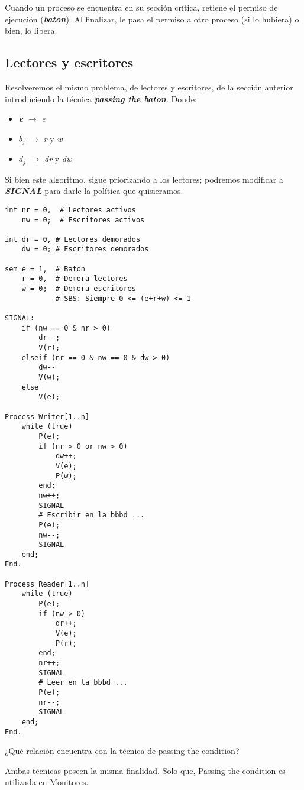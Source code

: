 \documentclass[a4paper, 10pt]{report}
\begin{document}
Cuando un proceso se encuentra en su sección crítica, retiene el permiso de ejecución (\textbf{\emph{baton}}). Al finalizar, le pasa el permiso a otro proceso (si lo hubiera) o bien, lo libera.

\subsection{Lectores y escritores}

Resolveremos el mismo problema, de lectores y escritores, de la sección anterior introduciendo la técnica \textbf{\emph{passing the baton}}. Donde:

\begin{itemize}
    \item \textbf{\emph{e}} $\rightarrow$ \emph{e}
    \item \textbf{\emph{$b_j$}} $\rightarrow$ \emph{r} y \emph{w}
    \item \textbf{\emph{$d_j$}} $\rightarrow$ \emph{dr} y \emph{dw}
\end{itemize}

Si bien este algoritmo, sigue priorizando a los lectores; podremos modificar a \textbf{\emph{SIGNAL}} para darle la política que quisieramos.

\begin{lstlisting}
int nr = 0,  # Lectores activos
    nw = 0;  # Escritores activos

int dr = 0, # Lectores demorados
    dw = 0; # Escritores demorados

sem e = 1,  # Baton
    r = 0,  # Demora lectores
    w = 0;  # Demora escritores
            # SBS: Siempre 0 <= (e+r+w) <= 1

SIGNAL:
    if (nw == 0 & nr > 0)
        dr--;
        V(r);
    elseif (nr == 0 & nw == 0 & dw > 0)
        dw--
        V(w);
    else
        V(e);

Process Writer[1..n]
    while (true)
        P(e);
        if (nr > 0 or nw > 0)
            dw++;
            V(e);
            P(w);
        end;
        nw++;
        SIGNAL
        # Escribir en la bbbd ...
        P(e);
        nw--;
        SIGNAL
    end;
End.

Process Reader[1..n]
    while (true)
        P(e);
        if (nw > 0)
            dr++;
            V(e);
            P(r);
        end;
        nr++;
        SIGNAL
        # Leer en la bbbd ...
        P(e);
        nr--;
        SIGNAL
    end;
End.
\end{lstlisting}

\begin{basic_box}
     ¿Qué relación encuentra con la técnica de passing the condition?

    Ambas técnicas poseen la misma finalidad. Solo que, Passing the condition es utilizada en Monitores.
\end{basic_box}
\end{document}
